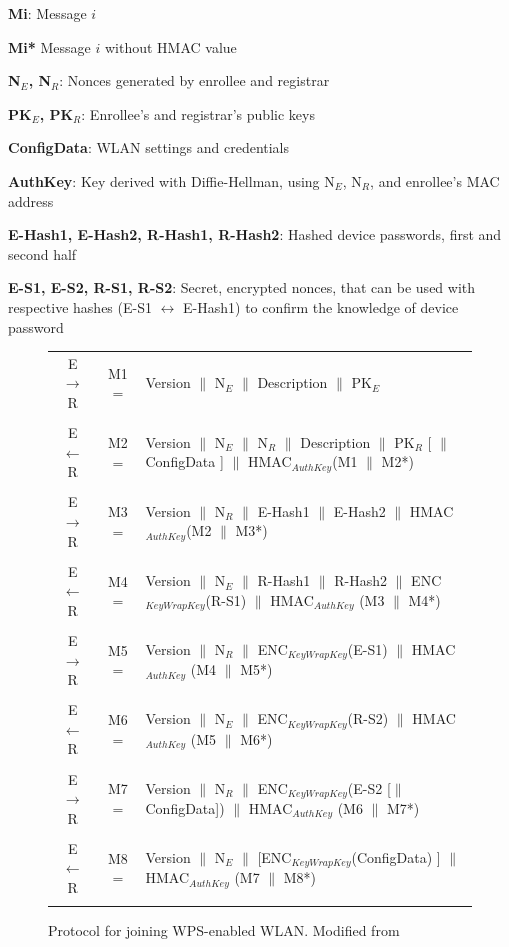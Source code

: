 \documentclass[12pt,a4paper,oneside,pdftex]{report}
\begin{document}
\textbf{Mi}: Message $i$

\textbf{Mi*} Message $i$ without HMAC value

\textbf{N$_E$, N$_R$}: Nonces generated by enrollee and registrar

\textbf{PK$_E$, PK$_R$}: Enrollee's and registrar's public keys

\textbf{ConfigData}: WLAN settings and credentials

\textbf{AuthKey}: Key derived with Diffie-Hellman, using N$_E$, N$_R$, and enrollee's MAC address

\textbf{E-Hash1, E-Hash2, R-Hash1, R-Hash2}: Hashed device passwords, first and second half

\textbf{E-S1, E-S2, R-S1, R-S2}: Secret, encrypted nonces, that can be used with respective hashes (E-S1 $\leftrightarrow$ E-Hash1) to confirm the knowledge of device password

\begin{figure}
\label{tab:wps_full}
\begin{tabular}{c|c p{10cm}}

E $\rightarrow$ R & M1 = & Version $\|$ N$_E$ $\|$ Description $\|$ PK$_E$ 
\\\\

E $\leftarrow$  R & M2 = & Version $\|$ N$_E$ $\|$ N$_R$ $\|$ Description $\|$ PK$_R$ [ $\|$ ConfigData ] $\|$ HMAC$_{AuthKey}$(M1 $\|$ M2*) 
\\\\

E $\rightarrow$ R & M3 = & Version $\|$ N$_R$ $\|$ E-Hash1 $\|$ E-Hash2 $\|$ HMAC$_{AuthKey}$(M2 $\|$ M3*) 
\\\\

E $\leftarrow$  R & M4 = & Version $\|$ N$_E$ $\|$ R-Hash1 $\|$ R-Hash2 $\|$ ENC$_{KeyWrapKey}$(R-S1) $\|$ HMAC$_{AuthKey}$ (M3 $\|$ M4*) 
\\\\

E $\rightarrow$ R & M5 = & Version $\|$ N$_R$ $\|$ ENC$_{KeyWrapKey}$(E-S1) $\|$ HMAC$_{AuthKey}$ (M4 $\|$ M5*) 
\\\\

E $\leftarrow$  R & M6 = & Version $\|$ N$_E$ $\|$ ENC$_{KeyWrapKey}$(R-S2) $\|$ HMAC$_{AuthKey}$ (M5 $\|$ M6*) 
\\\\

E $\rightarrow$ R & M7 = & Version $\|$ N$_R$ $\|$ ENC$_{KeyWrapKey}$(E-S2 [$\|$ConfigData]) $\|$ HMAC$_{AuthKey}$ (M6 $\|$ M7*) 
\\\\

E $\leftarrow$  R & M8 = & Version $\|$ N$_E$ $\|$ [ENC$_{KeyWrapKey}$(ConfigData) ] $\|$ HMAC$_{AuthKey}$ (M7 $\|$ M8*) 
\\\\

\end{tabular}
\caption{Protocol for joining WPS-enabled WLAN. Modified from \cite{microsoftWCN}}
\end{figure}
\end{document}
